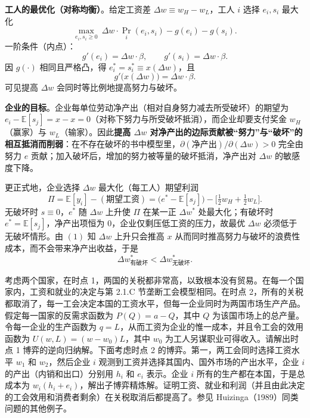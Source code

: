 \textbf{工人的最优化（对称均衡）}。给定工资差 $\Delta w\equiv w_H-w_L$，工人 $i$ 选择 $e_i,s_i$ 最大化
\[
\max_{e_i,s_i\ge 0}\ \Delta w\cdot\Pr_i(e_i,s_i)-g(e_i)-g(s_i).
\]\indent
一阶条件（内点）：
\[
g'(e_i)=\Delta w\cdot\beta,\qquad g'(s_i)=\Delta w\cdot\beta.
\]\indent
因 $g(\cdot)$ 相同且严格凸，得 $e_i^*=s_i^*\equiv x(\Delta w)$，且
\[
g'\bigl(x(\Delta w)\bigr)=\Delta w\cdot\beta.\tag{1}
\]\indent
可见提高 $\Delta w$ 会同时等比例地提高努力与破坏。

\textbf{企业的目标}。企业每单位劳动净产出（相对自身努力减去所受破坏）的期望为 $e_i-\mathbb{E}[s_j]=x-x=0$（对称下努力与所受破坏抵消），而企业却要支付奖金 $w_H$（赢家）与 $w_L$（输家）。因此\textbf{提高 $\Delta w$ 对净产出的边际贡献被“努力”与“破坏”的相互抵消而削弱}：在不存在破坏的书中模型里，$\partial(\text{净产出})/\partial(\Delta w)>0$ 完全由努力 $e$ 贡献；加入破坏后，增加的努力被等量的破坏抵消，净产出对 $\Delta w$ 的敏感度下降。

更正式地，企业选择 $\Delta w$ 最大化（每工人）期望利润
\[
\Pi= \mathbb{E}[y_i]-(\text{期望工资})
= \bigl(e^*-\mathbb{E}[s_j]\bigr)-\bigl[\tfrac12 w_H+\tfrac12 w_L\bigr].
\]\indent
无破坏时 $s\equiv 0$，$e^*$ 随 $\Delta w$ 上升使 $\Pi$ 在某一正 $\Delta w^*$ 处最大化；有破坏时 $e^*=\mathbb{E}[s_j]$，净产出项恒为 $0$，企业仅剩压低工资的压力，故最优 $\Delta w$ 必须低于无破坏情形。由 $(1)$ 知 $\Delta w$ 上升只会推高 $x$ 从而同时推高努力与破坏的浪费性成本，而不会带来净产出收益，于是
\[
\boxed{\Delta w_{\text{有破坏}}^{*}<\Delta w_{\text{无破坏}}^{*}}.
\]\indent
{}

考虑两个国家，在时点 1，两国的关税都非常高，以致根本没有贸易。在每一个国家内，工资和就业的决定与第 2.1.C 节垄断工会模型相同。在时点 2，所有的关税都取消了，每一工会决定本国的工资水平，但每一企业同时为两国市场生产产品。假定每一国家的反需求函数为 $P(Q)=a-Q$，其中 $Q$ 为该国市场上的总产量。令每一企业的生产函数为 $q=L$，从而工资为企业的惟一成本，并且令工会的效用函数为 $U(w,L)=(w-w_0)L$，其中 $w_0$ 为工人另谋职业可得收入。请解出时点 1 博弈的逆向归纳解。下面考虑时点 2 的博弈。第一，两工会同时选择工资水平 $w_1$ 和 $w_2$，然后企业 $i$ 观测到工资并选择其国内、国外市场的产出水平，企业 $i$ 的产出（内销和出口）分别用 $h_i$ 和 $e_i$ 表示。企业 $i$ 所有的生产都在本国，于是总成本为 $w_i(h_i+e_i)$，解出子博弈精炼解。证明工资、就业和利润（并且由此决定的工会效用和消费者剩余）在关税取消后都提高了。参见 Huizinga（1989）同类问题的其他例子。

